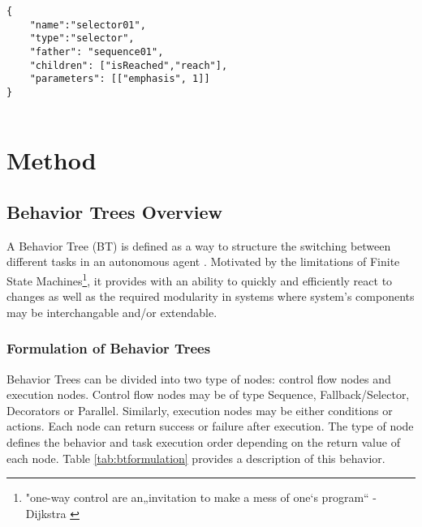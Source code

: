 \documentclass[letterpaper, 10 pt, conference]{ieeeconf}  %
\begin{document}
 \begin{verbatim}
{
    "name":"selector01",
    "type":"selector",
    "father": "sequence01",
    "children": ["isReached","reach"],
    "parameters": [["emphasis", 1]]
}


\end{verbatim}

\section{Method}


\subsection{Behavior Trees Overview}
A Behavior Tree (BT) is defined as a way to structure the switching between different tasks in an autonomous agent \cite{c1}. Motivated by the limitations of Finite State Machines\footnote{"one-way control are an„invitation to make a mess of one‘s program“ - Dijkstra \cite{c2}}, it provides with an ability to quickly and efficiently react to changes as well as the required modularity in systems where system's components may be interchangable and/or extendable.
\subsubsection{Formulation of Behavior Trees}
Behavior Trees can be divided into two type of nodes: control flow nodes and execution nodes. Control flow nodes may be of type Sequence, Fallback/Selector, Decorators or Parallel. Similarly, execution nodes may be either conditions or actions. Each node can return success or failure after execution. The type of node defines the behavior and task execution order depending on the return value of each node. Table \ref{tab:btformulation} provides a description of this behavior. 
\end{document}
